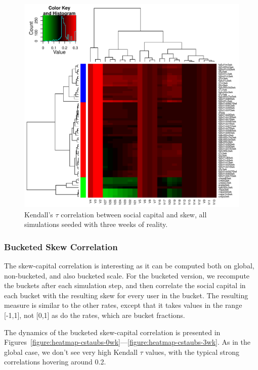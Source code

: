 \documentclass[10pt,oneside]{memoir}
\begin{document}
\begin{Spacing}{2}
\begin{figure}
\begin{center}
    \includegraphics{figures/crop/heatmap-cstau-3wk}
    \caption{Kendall’s $\tau$ correlation between social capital and skew, all simulations seeded with three weeks of reality.}
    \label{figure:heatmap-cstau-3wk}
\end{center}
\end{figure}
\pagebreak \subsubsection{Bucketed Skew Correlation}
\label{bucketedskewcorrelation}

The skew-capital correlation is interesting as it can be computed both on global, non-bucketed, and also bucketed scale.  For the bucketed version, we recompute the buckets after each simulation step, and then correlate the social capital in each bucket with the resulting skew for every user in the bucket.  The resulting measure is similar to the other rates, except that it takes values in the range [-1,1], not [0,1] as do the rates, which are bucket fractions.


The dynamics of the bucketed skew-capital correlation is presented in Figures~\ref{figure:heatmap-cstaubs-0wk}---\ref{figure:heatmap-cstaubs-3wk}.  As in the global case, we don't see very high Kendall $\tau$ values, with the typical strong correlations hovering around 0.2.  



\end{Spacing}
\end{document}
